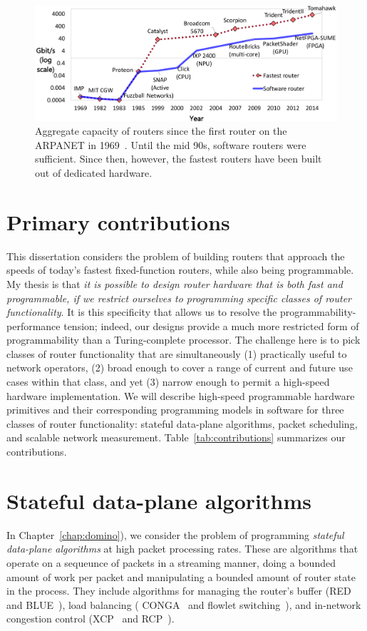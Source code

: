 \begin{figure}
\centering
\includegraphics[width=\columnwidth]{router_evolution.pdf}
\caption{Aggregate capacity of routers since the first router on the ARPANET in
1969~\cite{imp}. Until the mid 90s, software routers were sufficient. Since
then, however, the fastest routers have been built out of dedicated hardware.}
\label{fig:router_evolution}
\end{figure}

\section{Primary contributions}


This dissertation considers the problem of building routers that approach the
speeds of today's fastest fixed-function routers, while also being
programmable. My thesis is that {\em it is possible to design router hardware
that is both fast and programmable, if we restrict ourselves to programming
specific classes of router functionality}. It is this specificity that allows
us to resolve the programmability-performance tension; indeed, our designs
provide a much more restricted form of programmability than a Turing-complete
processor.  The challenge here is to pick classes of router functionality that
are simultaneously (1) practically useful to network operators, (2) broad
enough to cover a range of current and future use cases within that class, and
yet (3) narrow enough to permit a high-speed hardware implementation. We will
describe high-speed programmable hardware primitives and their corresponding
programming models in software for three classes of router functionality:
stateful data-plane algorithms, packet scheduling, and scalable network
measurement.  Table~\ref{tab:contributions} summarizes our contributions.

\section{Stateful data-plane algorithms}
In Chapter~\ref{chap:domino}), we consider the problem of programming {\em
stateful data-plane algorithms} at high packet processing rates. These are
algorithms that operate on a sequeunce of packets in a streaming manner, doing
a bounded amount of work per packet and manipulating a bounded amount of router
state in the process.  They include algorithms for managing the router's buffer
(\eg RED~\cite{red} and BLUE~\cite{blue}), load balancing (\eg
CONGA~\cite{conga} and flowlet switching~\cite{flowlets}), and in-network
congestion control (\eg XCP~\cite{xcp} and RCP~\cite{rcp}).


